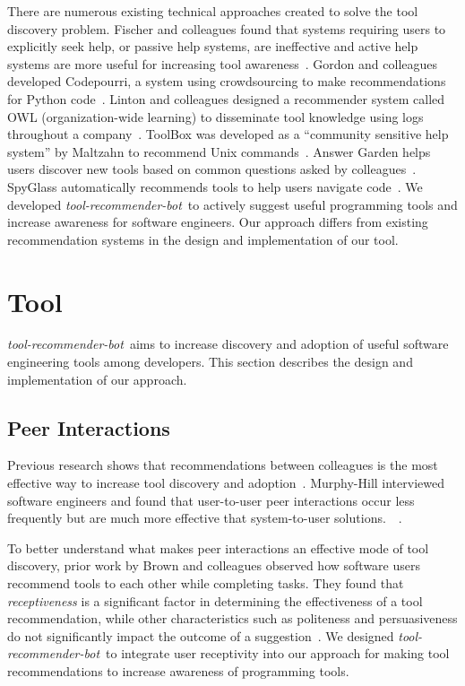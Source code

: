 \documentclass[sigconf,review,anonymous]{acmart}
\newcommand{\tool}{\textsl{tool-recommender-bot}}
\begin{document}
There are numerous existing technical approaches created to solve the tool discovery problem. Fischer and colleagues found that systems requiring users to explicitly seek help, or passive help systems, are ineffective and active help systems are more useful for increasing tool awareness~\cite{Fischer1984ActiveHelpSystems}. Gordon and colleagues developed Codepourri, a system using crowdsourcing to make recommendations for Python code~\cite{Gordon2015Codepourri}. Linton and colleagues designed a recommender system called OWL (organization-wide learning) to disseminate tool knowledge using logs throughout a company~\cite{Linton2000OWL}. ToolBox was developed as a ``community sensitive help system'' by Maltzahn to recommend Unix commands~\cite{Maltzahn1995Toolbox}. Answer Garden helps users discover new tools based on common questions asked by colleagues~\cite{Ackerman1990AnswerGarden}. SpyGlass automatically recommends tools to help users navigate code~\cite{Viriyakattiyaporn2010Spyglass}. We developed \tool~to actively suggest useful programming tools and increase awareness for software engineers. Our approach differs from existing recommendation systems in the design and implementation of our tool.

\section{Tool}
\tool~aims to increase discovery and adoption of useful software engineering tools among developers. This section describes the design and implementation of our approach.

\subsection{Peer Interactions}
Previous research shows that recommendations between colleagues is the most effective way to increase tool discovery and adoption~\cite{MurphyHill2011PeerInteraction}. Murphy-Hill interviewed software engineers and found that user-to-user peer interactions occur less frequently but are much more effective that system-to-user solutions.~\cite{MurphyHill2011PeerInteraction}~\cite{Murphy-Hill2015HowDoUsers}. 

To better understand what makes peer interactions an effective mode of tool discovery, prior work by Brown and colleagues observed how software users recommend tools to each other while completing tasks. They found that \emph{receptiveness} is a significant factor in determining the effectiveness of a tool recommendation, while other characteristics such as politeness and persuasiveness do not significantly impact the outcome of a suggestion~\cite{vlhcc17}. We designed \tool~to integrate user receptivity into our approach for making tool recommendations to increase awareness of programming tools.
\end{document}
